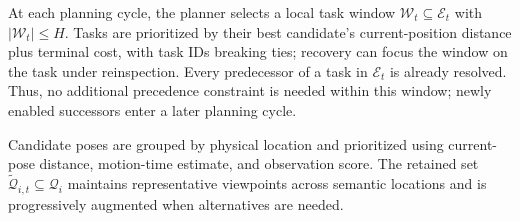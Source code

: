 \documentclass[letterpaper,10pt,journal]{IEEEtran}
\begin{document}
At each planning cycle, the planner selects a local task window $\mathcal W_t\subseteq\mathcal E_t$ with $|\mathcal W_t|\leq H$. Tasks are prioritized by their best candidate's current-position distance plus terminal cost, with task IDs breaking ties; recovery can focus the window on the task under reinspection. Every predecessor of a task in $\mathcal E_t$ is already resolved. Thus, no additional precedence constraint is needed within this window; newly enabled successors enter a later planning cycle.

Candidate poses are grouped by physical location and prioritized using current-pose distance, motion-time estimate, and observation score. The retained set $\widetilde{\mathcal Q}_{i,t}\subseteq\mathcal Q_i$ maintains representative viewpoints across semantic locations and is progressively augmented when alternatives are needed.
\end{document}
